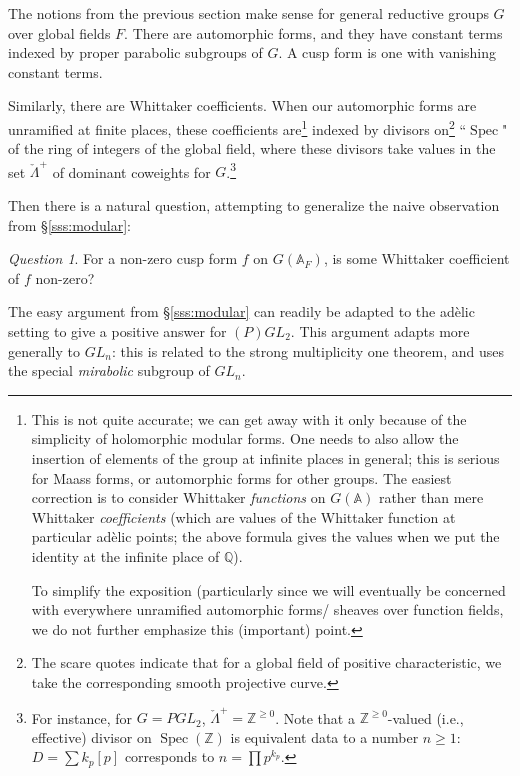 \documentclass[reqno,11pt]{amsart}
\numberwithin{equation}{subsection}
\theoremstyle{remark}
\newtheorem*{question*}{Question}
\newcommand{\bA}{{\mathbb A}}
\newcommand{\bQ}{{\mathbb Q}}
\newcommand{\bZ}{{\mathbb Z}}
\newcommand{\on}{\operatorname}
\newcommand{\Spec}{\on{Spec}}
\begin{document}
The notions from the previous section make sense for general 
reductive groups $G$ over global fields $F$.
There are automorphic forms, and they have constant terms indexed
by proper parabolic subgroups of $G$. A cusp form is one
with vanishing constant terms.

Similarly, there are Whittaker coefficients. When our automorphic forms
are unramified at finite places, these coefficients
are\footnote{This is not quite accurate; we can get away with it
only because of the simplicity of holomorphic modular forms. 
One needs to also allow the insertion
of elements of the group at infinite places in general; this is 
serious for Maass forms,
or automorphic forms for other groups. The easiest correction is to consider
Whittaker \emph{functions} on $G(\bA)$ rather than mere Whittaker \emph{coefficients}
(which are values of the Whittaker function at particular ad\`elic points; 
the above formula gives the values when we put the identity at the infinite place of $\bQ$). 

To simplify the exposition (particularly 
since we will eventually be concerned with everywhere unramified automorphic forms/
sheaves over function fields, we do not further emphasize this (important) point.
}
indexed by divisors on\footnote{The 
scare quotes indicate that for a global field of positive characteristic,
we take the corresponding smooth projective curve.} ``$\Spec$" of the ring
of integers of the global field, where these divisors take values in the
set $\check{\Lambda}^+$ of dominant coweights for $G$.\footnote{For instance,
for $G = PGL_2$, $\check{\Lambda}^+ = \bZ^{\geq 0}$. Note that 
a $\bZ^{\geq 0}$-valued (i.e., effective) divisor on $\Spec(\bZ)$ 
is equivalent data to a number $n \geq 1$: $D = \sum k_p [p]$ corresponds to 
$n = \prod p^{k_p}$.}

Then there is a natural question, attempting to generalize 
the naive observation from \S \ref{sss:modular}:

\begin{question*}

For a non-zero cusp form $f$ on $G(\bA_F)$, is some Whittaker
coefficient of $f$ non-zero?

\end{question*}

The easy argument from \S \ref{sss:modular} can readily be
adapted to the ad\`elic setting to give a positive answer for $(P)GL_2$. 
This argument adapts more generally to $GL_n$: 
this is related to the strong multiplicity one
theorem, and uses the special \emph{mirabolic} subgroup of $GL_n$.
\end{document}
